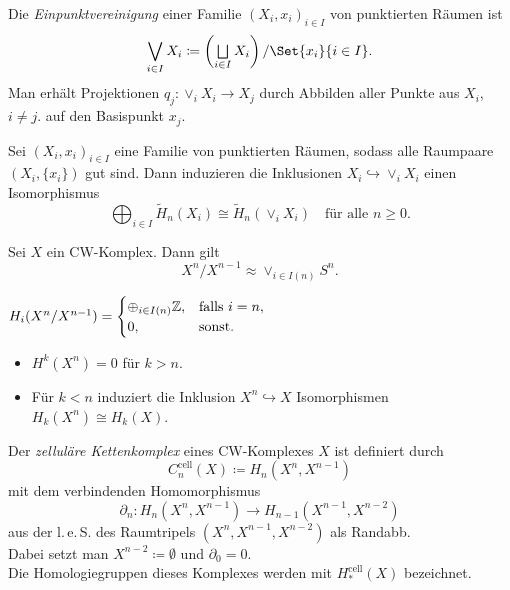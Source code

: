 \documentclass{cheat-sheet}
\newcommand{\RH}{\tilde{H}} %
\begin{document}
\begin{defn}
  Die \emph{Einpunktvereinigung} einer Familie $(X_i, x_i)_{i \in I}$ von punktierten Räumen ist
  \[ \bigvee_{i \in I} X_i \coloneqq \left( \bigsqcup_{i \in I} X_i \right) / \Set{x_i}{i \in I}. \]
  Man erhält Projektionen $q_j : \vee_i X_i \to X_j$ durch Abbilden aller Punkte aus $X_i$, $i \not= j$. auf den Basispunkt $x_j$.
\end{defn}

\begin{prop}
  Sei $(X_i, x_i)_{i \in I}$ eine Familie von punktierten Räumen, sodass alle Raumpaare $(X_i, \{ x_i \})$ gut sind. Dann induzieren die Inklusionen $X_i \hookrightarrow \vee_i X_i$ einen Isomorphismus
  \[
    \bigoplus_{i \in I} \RH_n(X_i) \cong \RH_n\left( \vee_i X_i \right) \quad
    \text{für alle $n \geq 0$.}
  \]
\end{prop}

\begin{lem}
  Sei $X$ ein CW-Komplex. Dann gilt
  \[ X^n/X^{n-1} \approx \vee_{i \in I(n)} S^n. \]
\end{lem}

\begin{kor}
  $H_i(X^n/X^{n-1}) = \begin{cases}
    \oplus_{i \in I(n)} \mathbb{Z}, & \text{falls } i = n, \\
    0, & \text{sonst.}
  \end{cases}$
\end{kor}

\begin{prop}
  \begin{itemize}
    \item $H^k(X^n) = 0$ für $k > n$.
    \item Für $k < n$ induziert die Inklusion $X^n \hookrightarrow X$ Isomorphismen $H_k(X^n) \cong H_k(X)$.
  \end{itemize}
\end{prop}

\begin{defn}
  Der \emph{zelluläre Kettenkomplex} eines CW-Komplexes $X$ ist definiert durch
  \[ C^\text{cell}_n(X) \coloneqq H_n(X^n, X^{n-1}) \]
  mit dem verbindenden Homomorphismus
  \[ \partial_n : H_n(X^n, X^{n-1}) \to H_{n-1}(X^{n-1}, X^{n-2}) \]
  aus der l.\,e.\,S. des Raumtripels $(X^n, X^{n-1}, X^{n-2})$ als Randabb.\\
  Dabei setzt man $X^{n-2} \coloneqq \emptyset$ und $\partial_0 = 0$.\\
  Die Homologiegruppen dieses Komplexes werden mit $H_*^\text{cell}(X)$ bezeichnet.
\end{defn}
\end{document}
